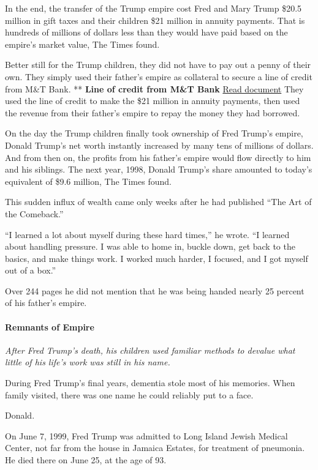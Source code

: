 In the end, the transfer of the Trump empire cost Fred and Mary Trump
\$20.5 million in gift taxes and their children \$21 million in annuity
payments. That is hundreds of millions of dollars less than they would
have paid based on the empire's market value, The Times found.

Better still for the Trump children, they did not have to pay out a
penny of their own. They simply used their father's empire as collateral
to secure a line of credit from M\&T Bank. ** \textbf{Line of credit
from M\&T Bank}
\href{https://int.nyt.com/data/documenthelper/144-djt-1996-ucc/9c5e1010469adaac01a2/optimized/full.pdf\#page=1}{Read
document} They used the line of credit to make the \$21 million in
annuity payments, then used the revenue from their father's empire to
repay the money they had borrowed.

On the day the Trump children finally took ownership of Fred Trump's
empire, Donald Trump's net worth instantly increased by many tens of
millions of dollars. And from then on, the profits from his father's
empire would flow directly to him and his siblings. The next year, 1998,
Donald Trump's share amounted to today's equivalent of \$9.6 million,
The Times found.

This sudden influx of wealth came only weeks after he had published
``The Art of the Comeback.''

``I learned a lot about myself during these hard times,'' he wrote. ``I
learned about handling pressure. I was able to home in, buckle down, get
back to the basics, and make things work. I worked much harder, I
focused, and I got myself out of a box.''

Over 244 pages he did not mention that he was being handed nearly 25
percent of his father's empire.

\hypertarget{remnants-of-empire}{%
\paragraph{Remnants of Empire}\label{remnants-of-empire}}

\emph{After Fred Trump's death, his children used familiar methods to
devalue what little of his life's work was still} \emph{in his name.}

During Fred Trump's final years, dementia stole most of his memories.
When family visited, there was one name he could reliably put to a face.

Donald.

On June 7, 1999, Fred Trump was admitted to Long Island Jewish Medical
Center, not far from the house in Jamaica Estates, for treatment of
pneumonia. He died there on June 25, at the age of 93.

